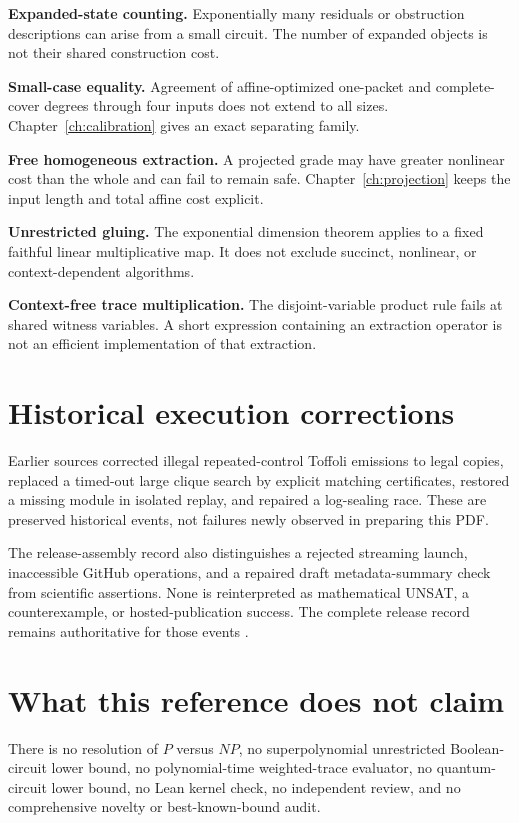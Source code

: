 \documentclass[11pt,letterpaper,oneside]{report}
\theoremstyle{komorebi}
\begin{document}
\textbf{Expanded-state counting.} Exponentially many residuals or obstruction descriptions can arise from a small circuit. The number of expanded objects is not their shared construction cost.

\textbf{Small-case equality.} Agreement of affine-optimized one-packet and complete-cover degrees through four inputs does not extend to all sizes. Chapter~\ref{ch:calibration} gives an exact separating family.

\textbf{Free homogeneous extraction.} A projected grade may have greater nonlinear cost than the whole and can fail to remain safe. Chapter~\ref{ch:projection} keeps the input length and total affine cost explicit.

\textbf{Unrestricted gluing.} The exponential dimension theorem applies to a fixed faithful linear multiplicative map. It does not exclude succinct, nonlinear, or context-dependent algorithms.

\textbf{Context-free trace multiplication.} The disjoint-variable product rule fails at shared witness variables. A short expression containing an extraction operator is not an efficient implementation of that extraction.

\section{Historical execution corrections}
Earlier sources corrected illegal repeated-control Toffoli emissions to legal copies, replaced a timed-out large clique search by explicit matching certificates, restored a missing module in isolated replay, and repaired a log-sealing race. These are preserved historical events, not failures newly observed in preparing this PDF.

The release-assembly record also distinguishes a rejected streaming launch, inaccessible GitHub operations, and a repaired draft metadata-summary check from scientific assertions. None is reinterpreted as mathematical UNSAT, a counterexample, or hosted-publication success. The complete release record remains authoritative for those events \cite{audit}.

\section{What this reference does not claim}
There is no resolution of $P$ versus $NP$, no superpolynomial unrestricted Boolean-circuit lower bound, no polynomial-time weighted-trace evaluator, no quantum-circuit lower bound, no Lean kernel check, no independent review, and no comprehensive novelty or best-known-bound audit.
\end{document}
